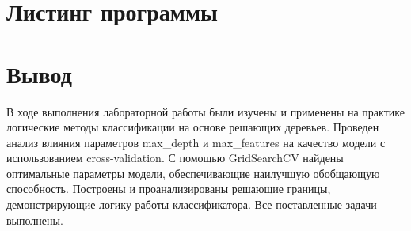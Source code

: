 \section{Листинг программы}



\section*{Вывод}
В ходе выполнения лабораторной работы были изучены и применены на практике логические методы классификации на основе решающих деревьев. Проведен анализ влияния параметров max\_depth и max\_features на качество модели с использованием cross-validation. С помощью GridSearchCV найдены оптимальные параметры модели, обеспечивающие наилучшую обобщающую способность. Построены и проанализированы решающие границы, демонстрирующие логику работы классификатора. Все поставленные задачи выполнены.
\endinput